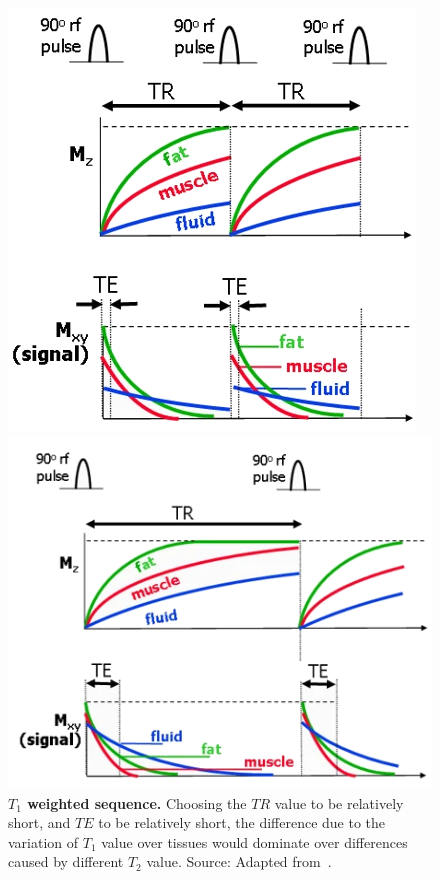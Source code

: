 \begin{figure}[tb]
    \centering
    \begin{minipage}[t]{.31\textwidth}
        \centering
        \includegraphics[width=.7\linewidth]{images/T1_weighted.png}
        \caption{\textbf{$T_1$ weighted sequence.} Choosing the $TR$ value to be relatively short, and $TE$ to be relatively short, the difference due to the variation of $T_1$ value over tissues would dominate over differences caused by different $T_2$ value. Source: Adapted from~\cite{ridgway_cardiovascular_2010}.}
        \label{fig:T1_weighted}
    \end{minipage}%
    \hspace{0.02\textwidth}
    \begin{minipage}[t]{.28\textwidth}
        \centering
        \includegraphics[width=\linewidth]{images/T2_weighted.png}

\end{minipage}
\end{figure}
